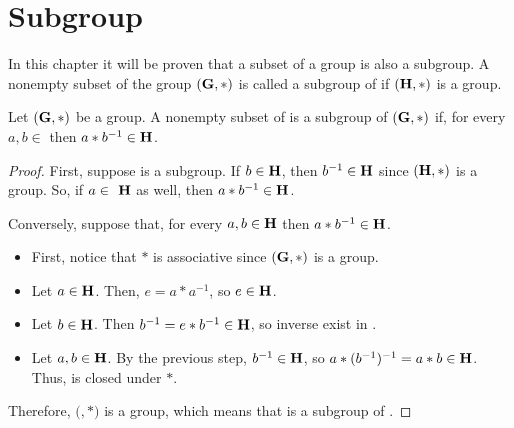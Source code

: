\section{Subgroup}
\label{sec:subgroup}
In this chapter it will be proven that a subset of a group is also a subgroup.
A nonempty subset  of the group $(\textbf{G},*)$ is called a subgroup of  if $(\textbf{H},*)$ is a group.

Let $(\textbf{G},*)$ be a group. A nonempty subset  of  is a subgroup of $(\textbf{G},*)$ if, for every $a, b \in $ then $a * b^{-1} \in  \textbf{H}$.

\begin{proof}
First, suppose  is a subgroup. If $b \in \textbf{H}$, then $b^{-1} \in \textbf{H}$ since $ (\textbf{H},*)$ is a group. So, if $a \in \m{ H}$ as well, then $a * b^{-1} \in \textbf{H}$.

Conversely, suppose that, for every $a, b \in \textbf{H}$ then $a * b^{-1} \in \textbf{H}$.

\begin {itemize}
\item First, notice that $*$ is associative since $(\textbf{G},*)$ is a group.
\item Let $a \in \m{H}$. Then, $e = a * a^{-1}$, so $e \in \textbf{H}$.
\item Let $b \in \textbf{H}$. Then $b^{-1} = e * b^{-1} \in \textbf{H}$, so inverse exist in .
\item Let $a, b \in \textbf{H}$. By the previous step, $b^{-1} \in \textbf{H}$, so $a* (b^{-1})^{-1} = a* b \in \textbf{H}$. Thus,  is closed under $*$.
\end {itemize}

Therefore, $($$,*)$ is a group, which means that  is a subgroup of .
\end{proof}